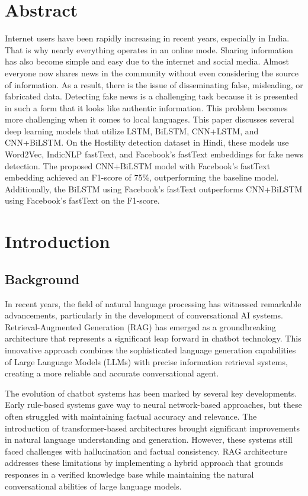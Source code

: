 \documentclass[12pt,a4paper]{report}
\begin{document}
\chapter*{Abstract}
Internet users have been rapidly increasing in recent years, especially in India. That is why nearly everything operates in an online mode. Sharing information has also become simple and easy due to the internet and social media. Almost everyone now shares news in the community without even considering the source of information. As a result, there is the issue
of disseminating false, misleading, or fabricated data. Detecting
fake news is a challenging task because it is presented in such
a form that it looks like authentic information. This problem
becomes more challenging when it comes to local languages.
This paper discusses several deep learning models that utilize
LSTM, BiLSTM, CNN+LSTM, and CNN+BiLSTM. On the
Hostility detection dataset in Hindi, these models use Word2Vec,
IndicNLP fastText, and Facebook’s fastText embeddings for
fake news detection. The proposed CNN+BiLSTM model with
Facebook’s fastText embedding achieved an F1-score of 75\%,
outperforming the baseline model. Additionally, the BiLSTM
using Facebook’s fastText outperforms CNN+BiLSTM using
Facebook’s fastText on the F1-score.

\chapter{Introduction}
\section{Background}

In recent years, the field of natural language processing has witnessed remarkable advancements, particularly in the development of conversational AI systems. Retrieval-Augmented Generation (RAG) has emerged as a groundbreaking architecture that represents a significant leap forward in chatbot technology. This innovative approach combines the sophisticated language generation capabilities of Large Language Models (LLMs) with precise information retrieval systems, creating a more reliable and accurate conversational agent.

The evolution of chatbot systems has been marked by several key developments. Early rule-based systems gave way to neural network-based approaches, but these often struggled with maintaining factual accuracy and relevance. The introduction of transformer-based architectures brought significant improvements in natural language understanding and generation. However, these systems still faced challenges with hallucination and factual consistency. RAG architecture addresses these limitations by implementing a hybrid approach that grounds responses in a verified knowledge base while maintaining the natural conversational abilities of large language models.
\end{document}
